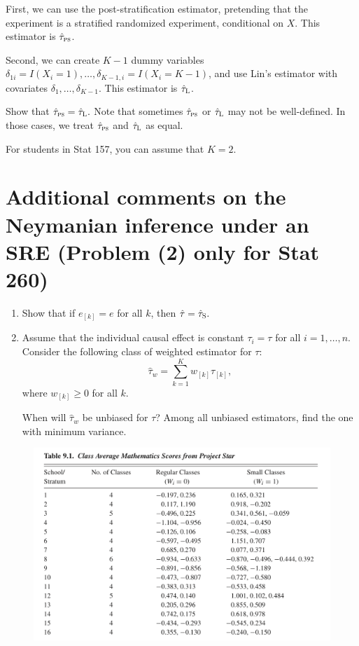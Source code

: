 \documentclass[11pt]{article}
\theoremstyle{definition}
\begin{document}
First, we can use the post-stratification estimator, pretending that the experiment is a stratified randomized experiment, conditional on $X$. This estimator is $\hat{\tau}_{\textsc{ps}}$. 

Second, we can create $K-1$ dummy variables $\delta_{1i} = I(X_i=1), \ldots, \delta_{K-1,i} = I(X_i=K-1)$, and use Lin's estimator with covariates $\delta_1,\ldots, \delta_{K-1}$. This estimator is $\hat{\tau}_\textsc{L}$. 

Show that $\hat{\tau}_{\textsc{ps}} = \hat{\tau}_\textsc{L}.$ Note that sometimes $\hat{\tau}_{\textsc{ps}}$ or $ \hat{\tau}_\textsc{L}$ may not be well-defined. In those cases, we treat $\hat{\tau}_{\textsc{ps}}$ and $ \hat{\tau}_\textsc{L}$ as equal. 


For students in Stat 157, you can assume that $K=2$.


\section{Additional comments on the Neymanian inference under an SRE (Problem (2) only for Stat 260)}


\begin{enumerate}
[(1)]
\item
Show that if $e_{[k]} = e$ for all $k$, then $\hat{\tau} = \hat{\tau}_\textsc{S}.$

\item 
Assume that the individual causal effect is constant $\tau_i = \tau$ for all $i=1,\ldots, n$. 
Consider the following class of weighted estimator for $\tau$:
$$
\hat{\tau}_w = \sum_{k=1}^K  w_{[k]}  \hat{\tau}_{[k]} ,
$$
where $w_{[k]} \geq 0$ for all $k$.

When will $\hat{\tau}_w $ be unbiased for $\tau$? Among all unbiased estimators, find the one with minimum variance. 


\end{enumerate}


 


\begin{figure}
\centering
\includegraphics[width = \textwidth]{table9_1.png}
\end{figure}





\end{document}
